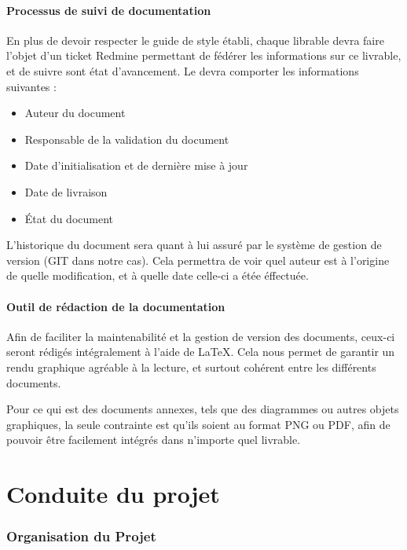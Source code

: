 \documentclass[a4paper, 18pt]{article}
\begin{document}
\subsection{Processus de suivi de documentation}

En plus de devoir respecter le guide de style établi, chaque librable devra faire l'objet d'un ticket Redmine permettant de fédérer les informations sur ce livrable, et de suivre sont état d'avancement. Le devra comporter les informations suivantes :

\begin{itemize}

\item Auteur du document
\item Responsable de la validation du document
\item Date d’initialisation et de dernière mise à jour
\item Date de livraison
\item État du document

\end{itemize}

L'historique du document sera quant à lui assuré par le système de gestion de version (GIT dans notre cas). Cela permettra de voir quel auteur est à l'origine de quelle modification, et à quelle date celle-ci a étée éffectuée.

\subsection{Outil de rédaction de la documentation}

Afin de faciliter la maintenabilité et la gestion de version des documents, ceux-ci seront rédigés intégralement à l'aide de LaTeX. Cela nous permet de garantir un rendu graphique agréable à la lecture, et surtout cohérent entre les différents documents.

Pour ce qui est des documents annexes, tels que des diagrammes ou autres objets graphiques, la seule contrainte est qu'ils soient au format PNG ou PDF, afin de pouvoir être facilement intégrés dans n'importe quel livrable.

\part{Conduite du projet}

\section{Organisation du Projet}
\end{document}
